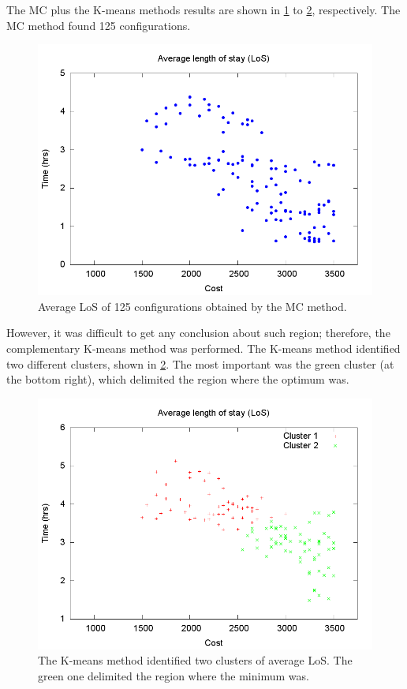 \documentclass[11pt]{article} %
\begin{document}
The MC plus the K-means methods results are shown in \ref{subfig:mc13-1}
to \ref{subfig:km13-1}, respectively. The MC method found 125 configurations.
\begin{figure}[H]
\noindent \centering{}\includegraphics[width=0.95\columnwidth,height=0.25\paperheight]{figs4/v0/MC/MC-6400-602-50-69-25-125confs-LoS}\caption{Average LoS of 125 configurations obtained by the MC method. \label{subfig:mc13-1}}
\end{figure}
 However, it was difficult to get any conclusion about such region;
therefore, the complementary K-means method was performed. The K-means
method identified two different clusters, shown in \ref{subfig:km13-1}.
The most important was the green cluster (at the bottom right), which
delimited the region where the optimum was.
\begin{figure}[H]
\noindent \centering{}\includegraphics[width=0.95\columnwidth,height=0.25\paperheight]{figs4/v0/MC/K-means-6400-602-75-69-25-125-Cluster1-54_Cluster2-63}\caption{The K-means method identified two clusters of average LoS. The green
one delimited the region where the minimum was.\label{subfig:km13-1}}
\end{figure}
\end{document}
